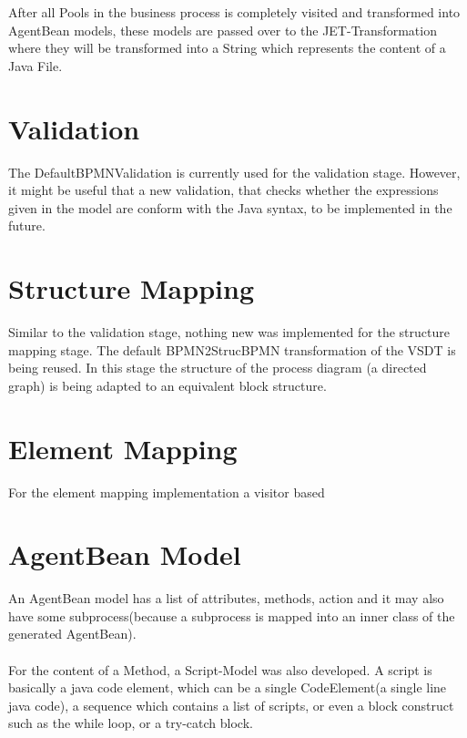 After all Pools in the business process is completely visited and transformed into AgentBean models, these models are passed over to the JET-Transformation where they will be transformed into a String which represents the content of a Java File. 
\newpage
\section{Validation}
The DefaultBPMNValidation is currently used for the validation stage. However, it might be useful that a new validation, that checks whether the expressions given in the model are conform with the Java syntax, to be implemented in the future.

\section{Structure Mapping}
Similar to the validation stage, nothing new was implemented for the structure mapping stage. The default BPMN2StrucBPMN transformation of the VSDT is being reused. In this stage the structure of the process diagram (a directed graph) is being adapted to an equivalent block structure.  

\section{Element Mapping}
For the element mapping implementation a visitor based 
\section{AgentBean Model}

An AgentBean model has a list of attributes, methods, action and it may also have some subprocess(because a subprocess is mapped into an inner class of the generated AgentBean).\\\\
For the content of a Method, a Script-Model was also developed. A script is basically a java code element, which can be a single CodeElement(a single line java code), a sequence which contains a list of scripts, or even a block construct such as the while loop, or a try-catch block. 

